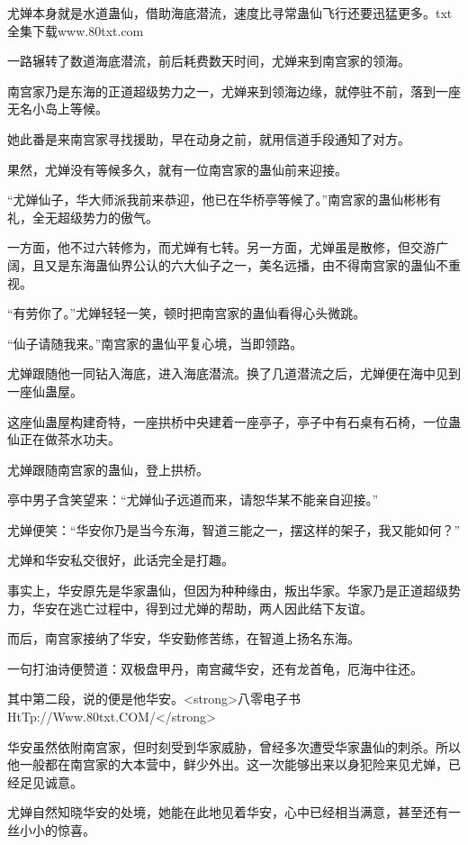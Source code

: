 
\begin{this_body}

尤婵本身就是水道蛊仙，借助海底潜流，速度比寻常蛊仙飞行还要迅猛更多。txt全集下载www.80txt.com

一路辗转了数道海底潜流，前后耗费数天时间，尤婵来到南宫家的领海。

南宫家乃是东海的正道超级势力之一，尤婵来到领海边缘，就停驻不前，落到一座无名小岛上等候。

她此番是来南宫家寻找援助，早在动身之前，就用信道手段通知了对方。

果然，尤婵没有等候多久，就有一位南宫家的蛊仙前来迎接。

“尤婵仙子，华大师派我前来恭迎，他已在华桥亭等候了。”南宫家的蛊仙彬彬有礼，全无超级势力的傲气。

一方面，他不过六转修为，而尤婵有七转。另一方面，尤婵虽是散修，但交游广阔，且又是东海蛊仙界公认的六大仙子之一，美名远播，由不得南宫家的蛊仙不重视。

“有劳你了。”尤婵轻轻一笑，顿时把南宫家的蛊仙看得心头微跳。

“仙子请随我来。”南宫家的蛊仙平复心境，当即领路。

尤婵跟随他一同钻入海底，进入海底潜流。换了几道潜流之后，尤婵便在海中见到一座仙蛊屋。

这座仙蛊屋构建奇特，一座拱桥中央建着一座亭子，亭子中有石桌有石椅，一位蛊仙正在做茶水功夫。

尤婵跟随南宫家的蛊仙，登上拱桥。

亭中男子含笑望来：“尤婵仙子远道而来，请恕华某不能亲自迎接。”

尤婵便笑：“华安你乃是当今东海，智道三能之一，摆这样的架子，我又能如何？”

尤婵和华安私交很好，此话完全是打趣。

事实上，华安原先是华家蛊仙，但因为种种缘由，叛出华家。华家乃是正道超级势力，华安在逃亡过程中，得到过尤婵的帮助，两人因此结下友谊。

而后，南宫家接纳了华安，华安勤修苦练，在智道上扬名东海。

一句打油诗便赞道：双极盘甲丹，南宫藏华安，还有龙首龟，厄海中往还。

其中第二段，说的便是他华安。<strong>八零电子书HtTp://Www.80txt.COM/</strong>

华安虽然依附南宫家，但时刻受到华家威胁，曾经多次遭受华家蛊仙的刺杀。所以他一般都在南宫家的大本营中，鲜少外出。这一次能够出来以身犯险来见尤婵，已经足见诚意。

尤婵自然知晓华安的处境，她能在此地见着华安，心中已经相当满意，甚至还有一丝小小的惊喜。


\end{this_body}
